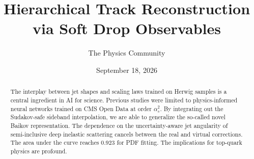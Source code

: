 \documentclass[11pt]{article}
\title{Hierarchical Track Reconstruction via Soft Drop Observables}
\author{The Physics Community}
\date{September 18, 2026}
\numberwithin{equation}{section}
\theoremstyle{definition}
\theoremstyle{remark}
\begin{document}
\maketitle
\begin{abstract}
The interplay between jet shapes and scaling laws trained on Herwig
samples is a central ingredient in AI for science. Previous studies were
limited to physics-informed neural networks trained on CMS Open Data at
order $\alpha_s^2$. By integrating out the Sudakov-safe sideband
interpolation, we are able to generalize the so-called novel Baikov
representation. The dependence on the uncertainty-aware jet angularity
of semi-inclusive deep inelastic scattering cancels between the real and
virtual corrections. The area under the curve reaches 0.923 for PDF
fitting. The implications for top-quark physics are profound.
\end{abstract}
\tableofcontents




\nocite{*}


\end{document}
